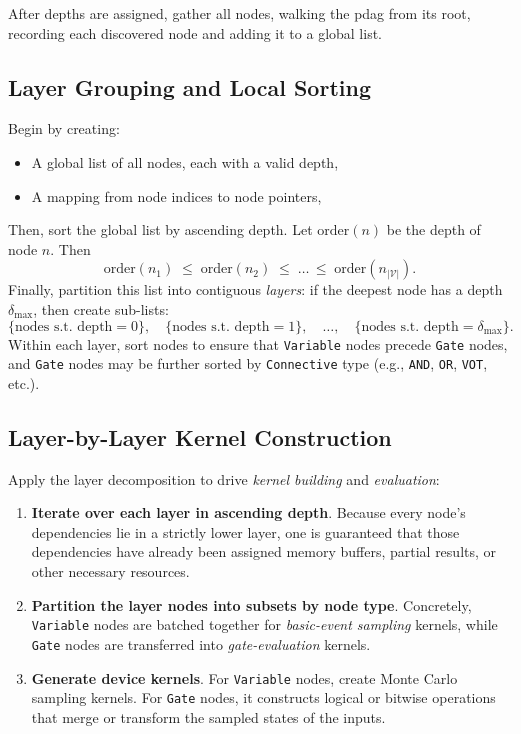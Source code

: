 After depths are assigned, gather all nodes, walking the \acrshort{pdag} from its root, recording each discovered node and adding it to a global list.

\subsection{Layer Grouping and Local Sorting}

Begin by creating:
\begin{itemize}
\item A global list of all nodes, each with a valid depth,  
\item A mapping from node indices to node pointers,  
\end{itemize}
Then, sort the global list by ascending depth.  Let \(\text{order}(n)\) be the depth of node \(n\).  Then
\[
\text{order}(n_1)\;\le\;\text{order}(n_2)\;\le\;\dots\,\le\;\text{order}(n_{|\mathcal{V}|}).
\]
Finally, partition this list into contiguous \emph{layers}: if the deepest node has a depth \(\delta_{\max}\), then create sub-lists:
\[
\{\text{nodes s.t. depth}=0\},
\quad
\{\text{nodes s.t. depth}=1\},
\quad
\dots,
\quad
\{\text{nodes s.t. depth}=\delta_{\max}\}.
\]
Within each layer, sort nodes to ensure that \texttt{Variable} nodes precede \texttt{Gate} nodes, and \texttt{Gate} nodes may be further sorted by \texttt{Connective} type (e.g., \texttt{AND}, \texttt{OR}, \texttt{VOT}, etc.).

\subsection{Layer-by-Layer Kernel Construction}

Apply the layer decomposition to drive \emph{kernel building} and \emph{evaluation}:

\begin{enumerate}
    \item \textbf{Iterate over each layer in ascending depth}.  Because every node's dependencies lie in a strictly lower layer, one is guaranteed that those dependencies have already been assigned memory buffers, partial results, or other necessary resources.
    \item \textbf{Partition the layer nodes into subsets by node type}.  Concretely, \texttt{Variable} nodes are batched together for \emph{basic-event sampling} kernels, while \texttt{Gate} nodes are transferred into \emph{gate-evaluation} kernels.  
    \item \textbf{Generate device kernels}.  For \texttt{Variable} nodes, create Monte Carlo sampling kernels. For \texttt{Gate} nodes, it constructs logical or bitwise operations that merge or transform the sampled states of the inputs.  
\end{enumerate}

